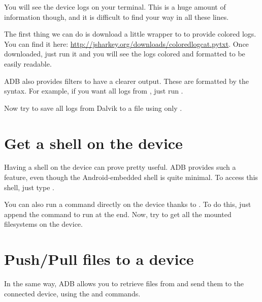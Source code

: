 You will see the device logs on your terminal. This is a huge amount of
information though, and it is difficult to find your way in all these lines.

The first thing we can do is download a little wrapper to  to provide colored
logs. You can find it here: \url{http://jsharkey.org/downloads/coloredlogcat.pytxt}. Once downloaded, just run it and you will see the logs colored and
formatted to be easily readable.

ADB also provides filters to have a clearer output. These are formatted by the
 syntax. For example, if you want all logs from ,
just run .

Now try to save all logs from Dalvik to a file using only .

\section{Get a shell on the device}

Having a shell on the device can prove pretty useful. ADB provides such a feature,
even though the Android-embedded shell is quite minimal. To access this shell,
just type .

You can also run a command directly on the device thanks to . To do
this, just append the command to run at the end. Now, try to get all the mounted
filesystems on the device.

\section{Push/Pull files to a device}

In the same way, ADB allows you to retrieve files from and send them to the
connected device, using the  and  commands. 

